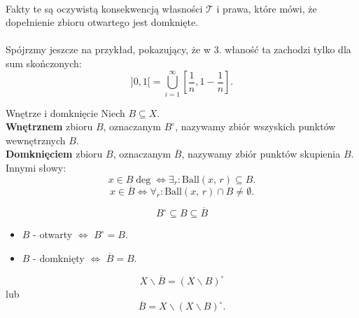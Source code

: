 \documentclass{article}
\numberwithin{defi}{section}
\numberwithin{defi}{section}
\newcommand{\oo}{\infty}
\newcommand{\Tau}{\mathcal{T}}
\newcommand{\dg}{^{\circ}}
\providecommand{\dg}{^\circ}
\newcommand{\ball}[2]{\text{Ball}(#1, \, #2)}
\begin{document}
\paragraph{} Fakty te są oczywistą konsekwencją własności $\Tau$ i prawa, które mówi, że dopełnienie zbioru otwartego jest domknięte.
\paragraph{} Spójrzmy jeszcze na przykład, pokazujący, że w 3. właność ta zachodzi tylko dla sum skończonych: \begin{equation*}
    ]0, 1[ = \bigcup_{i=1}^{\oo} [\frac{1}{n}, 1-\frac{1}{n}].
\end{equation*}

\begin{defr}{Wnętrze i domknięcie}
    Niech $B \subseteq X$.\\
    \textbf{Wnętrznem} zbioru $B$, oznaczanym $B \dg$, nazywamy zbiór wszyskich punktów wewnętrznych $B$.\\
    \textbf{Domknięciem} zbioru $B$, oznaczanym $\overline{B}$, nazywamy zbiór punktów skupienia $B$. \\
    Innymi słowy: \begin{equation}
        x \in B \deg \iff \exists_r: \ball{x}{r} \subseteq B.
    \end{equation} \begin{equation}
        x \in \overline{B} \iff \forall_r: \ball{x}{r} \cap B \neq \emptyset.
    \end{equation}
\end{defr}

\begin{obs}{}
    \begin{equation}
        B \dg \subseteq B \subseteq \overline{B}
    \end{equation}
\end{obs}

\begin{obs}{}
    \begin{itemize}
        \item $B$ - otwarty $\iff$ $B \dg = B.$
        \item $B$ - domknięty $\iff$ $\overline{B} = B.$
    \end{itemize}
\end{obs}

\begin{twier}{}
    \begin{equation}
        X \backslash \overline{B} = (X \backslash B) \dg
    \end{equation} lub \begin{equation}
        \overline{B} = X \backslash (X \backslash B) \dg.
    \end{equation}
\end{twier}
\end{document}
